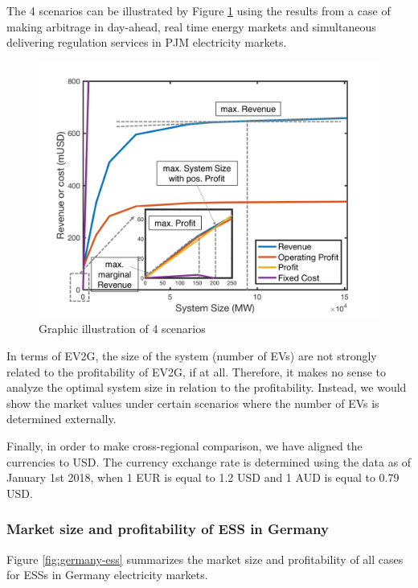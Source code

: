 The 4 scenarios can be illustrated by Figure \ref{fig:scenario-illustration} using the results from a case of making arbitrage in day-ahead, real time energy markets and simultaneous delivering regulation services in PJM electricity markets.
\begin{figure}[h!]
	\centering
	\includegraphics[width=0.95\linewidth]{Figures/Scenario_illustration}
	\caption{Graphic illustration of 4 scenarios}
	\label{fig:scenario-illustration}
\end{figure}

In terms of EV2G, the size of the system (number of EVs) are not strongly related to the profitability of EV2G, if at all. Therefore, it makes no sense to analyze the optimal system size in relation to the profitability. Instead, we would show the market values under certain scenarios where the number of EVs is determined externally. 

Finally, in order to make cross-regional comparison, we have aligned the currencies to USD. The currency exchange rate is determined using the data as of January 1st 2018, when 1 EUR is equal to 1.2 USD and 1 AUD is equal to 0.79 USD. 

\subsubsection{Market size and profitability of ESS in Germany}
Figure \ref{fig:germany-ess} summarizes the market size and profitability of all cases for ESSs in Germany electricity markets. 


